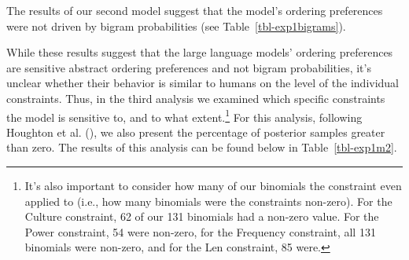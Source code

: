 \documentclass[
  12pt,
  letterpaper,
]{scrreport}
\begin{document}
The results of our second model suggest that the model's ordering
preferences were not driven by bigram probabilities (see
Table~\ref{tbl-exp1bigrams}).

\begin{table}

\caption{\label{tbl-exp1bigrams}Model results examining the effect of
AbsPref and Bigram Probabilities on LogOdds(AandB).}


\end{table}%

While these results suggest that the large language models' ordering
preferences are sensitive abstract ordering preferences and not bigram
probabilities, it's unclear whether their behavior is similar to humans
on the level of the individual constraints. Thus, in the third analysis
we examined which specific constraints the model is sensitive to, and to
what extent.\footnote{It's also important to consider how many of our
  binomials the constraint even applied to (i.e., how many binomials
  were the constraints non-zero). For the Culture constraint, 62 of our
  131 binomials had a non-zero value. For the Power constraint, 54 were
  non-zero, for the Frequency constraint, all 131 binomials were
  non-zero, and for the Len constraint, 85 were.} For this analysis,
following Houghton et al.
(),
we also present the percentage of posterior samples greater than zero.
The results of this analysis can be found below in
Table~\ref{tbl-exp1m2}.
\end{document}
